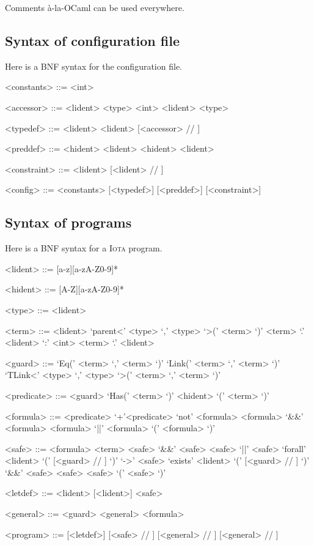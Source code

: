 \documentclass[10pt,a4paper]{article}
\newcommand\Iota{\textsc{Iota}}
\begin{document}
Comments à-la-OCaml can be used everywhere.

\subsection{Syntax of configuration file}
\label{subsec:syntaxconfig} Here is a BNF syntax for the configuration file.
\begin{grammar}
  <constants> ::=
    \lit{=} <int>

  <accessor> ::=
  <lident>  <type>
  \alt <int> <lident>  <type>

  <typedef> ::=
   <lident>
  \alt {} <lident> \lit{=} [<accessor> // \lit{|}]

  <preddef> ::=
   <hident>  <lident>
  \alt {} <hident>  <lident>

  <constraint> ::=
   <lident>  [<lident> // \lit{|}]

  <config> ::=
  <constants> [<typedef>] [<preddef>] [<constraint>]
\end{grammar}

\subsection{Syntax of programs}
\label{subsec:syntaxprog} Here is a BNF syntax for a \Iota{} program.
\begin{grammar}
  <lident> ::= [a-z][a-zA-Z0-9]*

  <hident> ::= [A-Z][a-zA-Z0-9]*

  <type> ::= <lident>

  <term> ::= <lident>
  \alt `parent<' <type> `,' <type> `>(' <term> `)'
  \alt <term> `.' <lident> `:' <int>
  \alt <term> `.' <lident>

  <guard> ::= `Eq(' <term> `,' <term> `)'
  \alt `Link(' <term> `,' <term> `)'
  \alt `TLink<' <type> `,' <type> `>(' <term> `,' <term> `)'

  <predicate> ::= <guard>
  \alt `Has(' <term> `)'
  \alt <hident> `(' <term> `)'

  <formula> ::= <predicate>
  \alt `+'<predicate>
  \alt `not' <formula>
  \alt <formula> `&&' <formula>
  \alt <formula> `||' <formula>
  \alt `(' <formula> `)'

  <safe> ::= <formula>
  \alt <term>
  \alt <safe> `&&' <safe>
  \alt <safe> `||' <safe>
  \alt `forall' <lident> `(' [<guard> // \lit{||}] `)' `->' <safe>
  \alt `exists' <lident> `(' [<guard> // \lit{||}] `)' `&&' <safe>
  \alt <safe> <safe>
  \alt `(' <safe> `)'

  <letdef> ::=  <lident> [<lident>] \lit{=} <safe>

  <general> ::=
  <guard> \lit{->} <general>
  \alt \lit{=>} <formula>

  <program> ::=
  [<letdef>]  [<safe> // \lit{;}]  [<general> // \lit{;}]  [<general> // \lit{;}]

\end{grammar}



\end{document}

